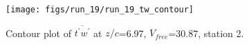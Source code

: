 \begin{figure}[H]
\centering
\texttt{[image: figs/run\_19/run\_19\_tw\_contour]}
\caption{Contour plot of $\overline{t^\prime w^\prime}$ at $z/c$=6.97, $V_{free}$=30.87, station 2.}
\label{fig:run_19_tw_contour}
\end{figure}


